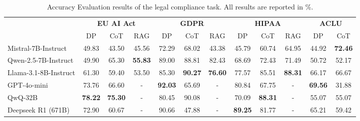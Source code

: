 \begin{table*}[t]
    \centering
    \small
    \setlength{\tabcolsep}{3pt}
    \begin{tabular}{l|ccc|ccc|ccc | cc} 
        \toprule
        \multirow{2}{*}{} 
        & \multicolumn{3}{c|}{\textbf{EU AI Act}} & \multicolumn{3}{c|}{\textbf{GDPR}} & \multicolumn{3}{c|}{\textbf{HIPAA}} & \multicolumn{2}{c}{\textbf{ACLU}}\\ 
        \textbf{Model}  & DP & CoT & RAG & DP & CoT & RAG & DP & CoT & RAG & DP & CoT \\ 
        \midrule
        Mistral-7B-Instruct & 49.83 & 43.50 & 45.56 & 72.29 & 68.02 & 43.38 & 45.79 & 60.74 & 64.95 & 44.92 & \textbf{72.46}\\
        Qwen-2.5-7B-Instruct & 49.90 & 65.30 & \textbf{55.83} & 89.00 & 88.81 & 82.43 & 68.69 & 72.43 & 71.49 & 50.72 & 52.17 \\
        Llama-3.1-8B-Instruct & 61.30 & 59.40 & 53.50 & 85.30 & \textbf{90.27} & \textbf{76.60} & 77.57 & 85.51 & \textbf{88.31}  & 66.17 & 66.67\\
        GPT-4o-mini & 73.76 & 66.60 & - & \textbf{92.03} & 65.69 & - & 80.84 & 67.75 & - & \textbf{69.56} & 31.88\\
        QwQ-32B & \textbf{78.22} & \textbf{75.30} & - & 80.45 & 90.08 & - & 70.09 & \textbf{88.31} & - &  55.07& 55.07 \\

        \multirow{1}{*}{Deepseek R1 (671B)} & 72.90 & 60.67 & - & 90.66 & 47.88 & - & \textbf{89.25} & 81.77 & -& 65.21 & 59.42 \\
         
        \bottomrule
    \end{tabular}
    \vspace{-0.1in}
    \caption{Accuracy Evaluation results of the legal compliance task. All results are reported in \%.}
    \label{tab:privacy_result}
    \vspace{-0.1in}
\end{table*}








